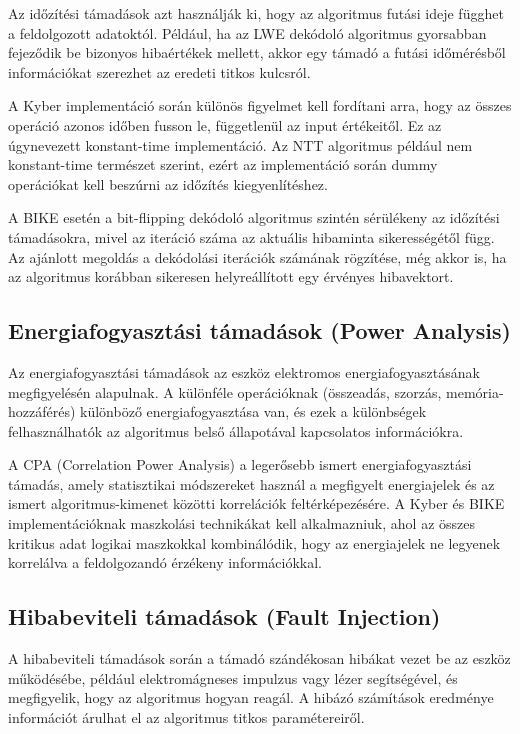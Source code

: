 Az időzítési támadások azt használják ki, hogy az algoritmus futási ideje függhet 
a feldolgozott adatoktól. Például, ha az LWE dekódoló algoritmus gyorsabban fejeződik be 
bizonyos hibaértékek mellett, akkor egy támadó a futási időmérésből információkat szerezhet 
az eredeti titkos kulcsról.

A Kyber implementáció során különös figyelmet kell fordítani arra, hogy az összes operáció 
azonos időben fusson le, függetlenül az input értékeitől. Ez az úgynevezett konstant-time 
implementáció. Az NTT algoritmus például nem konstant-time természet szerint, ezért 
az implementáció során dummy operációkat kell beszúrni az időzítés kiegyenlítéshez.

A BIKE esetén a bit-flipping dekódoló algoritmus szintén sérülékeny az időzítési 
támadásokra, mivel az iteráció száma az aktuális hibaminta sikerességétől függ. 
Az ajánlott megoldás a dekódolási iterációk számának rögzítése, még akkor is, 
ha az algoritmus korábban sikeresen helyreállított egy érvényes hibavektort.

\subsection{Energiafogyasztási támadások (Power Analysis)}

Az energiafogyasztási támadások az eszköz elektromos energiafogyasztásának 
megfigyelésén alapulnak. A különféle operációknak (összeadás, szorzás, 
memória-hozzáférés) különböző energiafogyasztása van, és ezek a különbségek 
felhasználhatók az algoritmus belső állapotával kapcsolatos információkra.

A CPA (Correlation Power Analysis) a legerősebb ismert energiafogyasztási támadás, 
amely statisztikai módszereket használ a megfigyelt energiajelek és az ismert 
algoritmus-kimenet közötti korrelációk feltérképezésére. A Kyber és BIKE 
implementációknak maszkolási technikákat kell alkalmazniuk, ahol az összes 
kritikus adat logikai maszkokkal kombinálódik, hogy az energiajelek ne 
legyenek korrelálva a feldolgozandó érzékeny információkkal.

\subsection{Hibabeviteli támadások (Fault Injection)}

A hibabeviteli támadások során a támadó szándékosan hibákat vezet be az 
eszköz működésébe, például elektromágneses impulzus vagy lézer segítségével, 
és megfigyelik, hogy az algoritmus hogyan reagál. A hibázó számítások 
eredménye információt árulhat el az algoritmus titkos paramétereiről.

